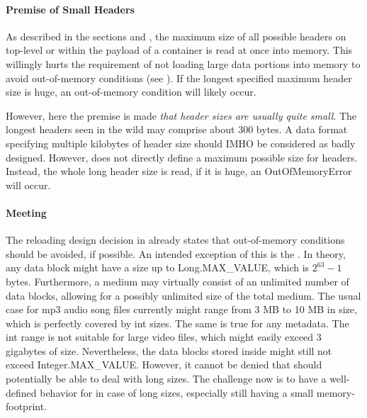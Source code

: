 \paragraph{Premise of Small Headers}
\label{sec:PremiseofSmallHeaders}

As described in the sections  and , the maximum size of all possible headers on top-level or within the payload of a container is read at once into memory. This willingly hurts the requirement of not loading large data portions into memory to avoid out-of-memory conditions (see ). If the longest specified maximum header size is huge, an out-of-memory condition will likely occur.

However, here the premise is made \emph{that header sizes are usually quite small}. The longest headers seen in the wild may comprise about 300 bytes. A data format specifying multiple kilobytes of header size should IMHO be considered as badly designed. However, \LibName{} does not directly define a maximum possible size for headers. Instead, the whole long header size is read, if it is huge, an OutOfMemoryError will occur.


\paragraph{Meeting \REQUcrlLargeData{}}
\label{sec:MeetingHandlingLargePayload}

The reloading design decision in  already states that out-of-memory conditions should be avoided, if possible. An intended exception of this is the . In theory, any data block might have a size up to Long.MAX_VALUE, which is $2^{63}-1$ bytes. Furthermore, a medium may virtually consist of an unlimited number of data blocks, allowing for a possibly unlimited size of the total medium. The usual case for mp3 audio song files currently might range from 3 MB to 10 MB in size, which is perfectly covered by int sizes. The same is true for any metadata. The int range is not suitable for large video files, which might easily exceed 3 gigabytes of size. Nevertheless, the data blocks stored inside might still not exceed Integer.MAX_VALUE. However, it cannot be denied that \LibName{} should potentially be able to deal with long sizes. The challenge now is to have a well-defined behavior for \LibName{} in case of long sizes, especially still having a small memory-footprint.


